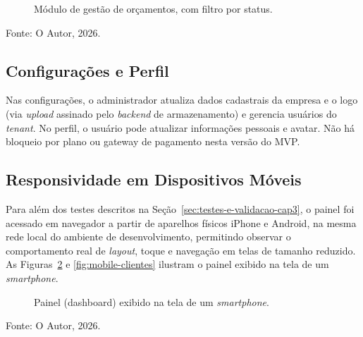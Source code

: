 \begin{figure}[H]
  \centering
  \captionsetup{justification=centering}
  \caption{Módulo de gestão de orçamentos, com filtro por status.}
  \label{fig:orcamentos}
\end{figure}
{\centering\small Fonte: O Autor, 2026.\par}
\vspace{0.8em}


\subsection{Configurações e Perfil}

Nas configurações, o administrador atualiza dados cadastrais da empresa e o logo (via \textit{upload} assinado pelo \textit{backend} de armazenamento) e gerencia usuários do \textit{tenant}. No perfil, o usuário pode atualizar informações pessoais e avatar. Não há bloqueio por plano ou gateway de pagamento nesta versão do MVP.

\subsection{Responsividade em Dispositivos Móveis}

Para além dos testes descritos na Seção~\ref{sec:testes-e-validacao-cap3}, o painel foi acessado em navegador a partir de aparelhos físicos iPhone e Android, na mesma rede local do ambiente de desenvolvimento, permitindo observar o comportamento real de \textit{layout}, toque e navegação em telas de tamanho reduzido. As Figuras~\ref{fig:mobile-dashboard} e \ref{fig:mobile-clientes} ilustram o painel exibido na tela de um \textit{smartphone}.

\begin{figure}[H]
  \centering
  \captionsetup{justification=centering}
  \caption{Painel (dashboard) exibido na tela de um \textit{smartphone}.}
  \label{fig:mobile-dashboard}
\end{figure}
{\centering\small Fonte: O Autor, 2026.\par}
\vspace{0.8em}

